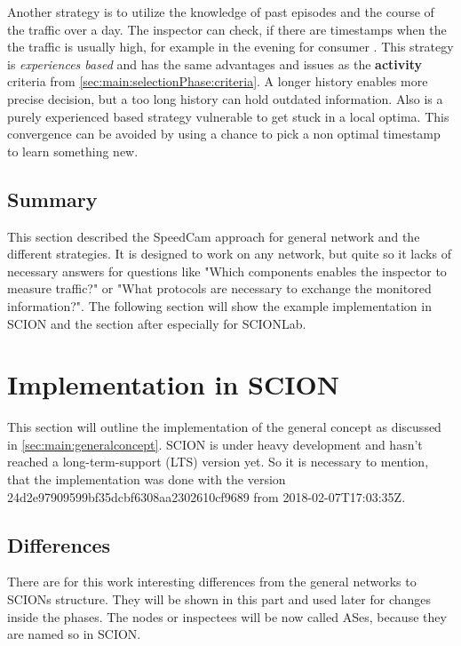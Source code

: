 \documentclass[thesis.tex]{subfiles}
\begin{document}
Another strategy is to utilize the knowledge of past episodes and the course of the traffic over a day. The inspector can check, if there are timestamps when the the traffic is usually high, for example in the evening for consumer . This strategy is \textit{experiences based} and has the same advantages and issues as the \textbf{activity} criteria from \autoref{sec:main:selectionPhase:criteria}. A longer history enables more precise decision, but a too long history can hold outdated information. Also is a purely experienced based strategy vulnerable to get stuck in a local optima. This convergence can be avoided by using a chance to pick a non optimal timestamp to learn something new.

\subsection{Summary}
This section described the SpeedCam approach for general network and the different strategies. It is designed to work on any network, but quite so it lacks of necessary answers for questions like "Which components enables the inspector to measure traffic?" or "What protocols are necessary to exchange the monitored information?". The following section will show the example implementation in SCION and the section after especially for SCIONLab.

\section{Implementation in SCION} \label{sec:main:scionimpl}

This section will outline the implementation of the general concept as discussed in \autoref{sec:main:generalconcept}. SCION is under heavy development and hasn't reached a long-term-support (LTS) version yet. So it is necessary to mention, that the implementation was done with the version  24d2e97909599bf35dcbf6308aa2302610cf9689 from 2018-02-07T17:03:35Z. 

\subsection{Differences}

There are for this work interesting differences from the general networks to SCIONs structure. They will be shown in this part and used later for changes inside the phases. The nodes or inspectees will be now called ASes, because they are named so in SCION.
\end{document}
